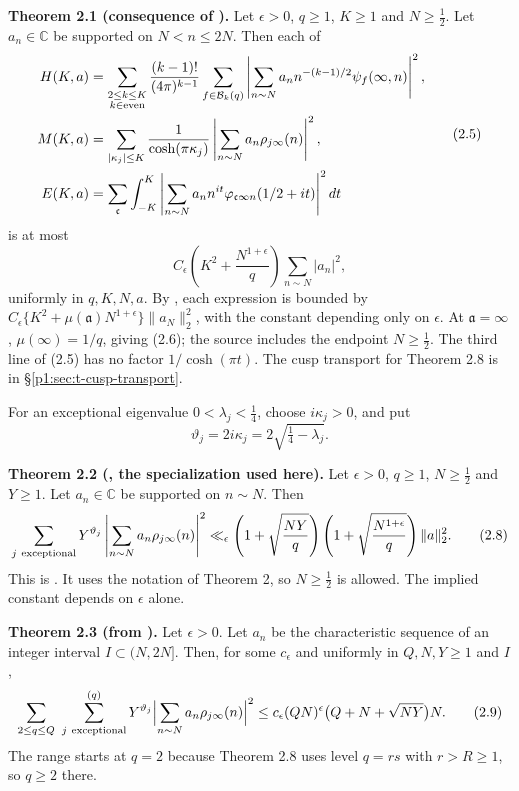 \textbf{Theorem 2.1 (consequence of \cite[Theorem~2]{DI82}).} Let $\epsilon>0$, $q\geq1$, $K\geq1$ and $N\geq\tfrac12$. Let $a_n\in\mathbb C$ be supported on $N<n\leq2N$. Then each of
\[
\begin{split}
 H(K,a)&=\sum_{\substack{2\leq k\leq K\\k\in{\rm even}}}
 \frac{(k-1)!}{(4\pi)^{k-1}}
 \sum_{f\in\mathcal B_k(q)}
 \left|\sum_{n\sim N}a_n n^{-(k-1)/2}\psi_f(\infty,n)\right|^2,\\
 M(K,a)&=\sum_{|\kappa_j|\leq K}
 \frac1{\cosh(\pi\kappa_j)}
 \left|\sum_{n\sim N}a_n\rho_{j\infty}(n)\right|^2,\\
 E(K,a)&=\sum_{\mathfrak c}\int_{-K}^{K}
 \left|\sum_{n\sim N}a_n n^{it}
 \varphi_{\mathfrak c\infty n}(1/2+it)\right|^2dt
\end{split}
\tag{2.5}\label{p1:eq:2.5}
\]
is at most
\[
 C_\epsilon\left(K^2+\frac{N^{1+\epsilon}}q\right)
 \sum_{n\sim N}|a_n|^2,
\tag{2.6}\label{p1:eq:2.6}
\]
uniformly in $q,K,N,a$. By \cite[Theorem~2, (1.28)--(1.30)]{DI82},
each expression is bounded by
$C_\epsilon\{K^2+\mu(\mathfrak a)N^{1+\epsilon}\}\|a_N\|_2^2$,
with the constant depending only on $\epsilon$. At
$\mathfrak a=\infty$, $\mu(\infty)=1/q$, giving (2.6); the source includes
the endpoint $N\geq\tfrac12$. The third line of (2.5) has no factor
$1/\cosh(\pi t)$. The cusp transport for Theorem 2.8 is in
\S\ref{p1:sec:t-cusp-transport}.

For an exceptional eigenvalue $0<\lambda_j<\tfrac14$, choose $i\kappa_j>0$, and put
\[
 \vartheta_j=2i\kappa_j=2\sqrt{\tfrac14-\lambda_j}.
\tag{2.7}\label{p1:eq:2.7}
\]

\textbf{Theorem 2.2 (\cite[Theorem~5]{DI82}, the specialization used here).} Let $\epsilon>0$, $q\geq1$, $N\geq\tfrac12$ and $Y\geq1$. Let $a_n\in\mathbb C$ be supported on $n\sim N$. Then
\[
 \sum_{j\ {\rm exceptional}}Y^{\vartheta_j}
 \left|\sum_{n\sim N}a_n\rho_{j\infty}(n)\right|^2
 \ll_\epsilon
 \left(1+\sqrt{\frac{NY}q}\right)
 \left(1+\sqrt{\frac{N^{1+\epsilon}}q}\right)\|a\|_2^2.
\tag{2.8}\label{p1:eq:2.8}
\]
This is \cite[Theorem~5]{DI82}. It uses the notation of Theorem 2, so $N\geq\tfrac12$ is allowed. The implied constant depends on $\epsilon$ alone.

\textbf{Theorem 2.3 (from \cite[proof of Theorem~7, (8.17)]{DI82}).} Let $\epsilon>0$. Let $a_n$ be the characteristic sequence of an integer interval
$I\subset(N,2N]$. Then, for some $c_\epsilon$ and uniformly in $Q,N,Y\ge1$ and $I$,
\[
\sum_{2\le q\le Q}\ \sum_{j\ {\rm exceptional}}^{(q)}Y^{\vartheta_j}
\Bigl|\sum_{n\sim N}a_n\rho_{j\infty}(n)\Bigr|^2\le c_\epsilon(QN)^\epsilon\bigl(Q+N+\sqrt{NY}\bigr)N.
\tag{2.9}\label{p1:eq:2.9}
\]
The range starts at $q=2$ because Theorem 2.8 uses level $q=rs$ with $r>R\ge1$, so $q\ge2$ there.

